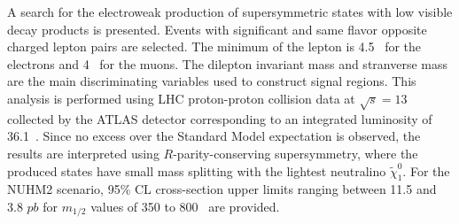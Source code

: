 A search for the electroweak production of supersymmetric states with low \pt visible decay products is presented.
Events with significant \met and same flavor opposite charged lepton pairs are selected.
The minimum \pt of the lepton is 4.5~{\GeV} for the electrons and 4~{\GeV} for the muons.
The dilepton invariant mass and stranverse mass are the main discriminating variables used to construct signal regions.
This analysis is performed using LHC proton-proton collision data at $\sqrt{s} = 13$~{\TeV} collected by the ATLAS detector corresponding to an integrated luminosity of 36.1~\ifb.
Since no excess over the Standard Model expectation is observed, the results are interpreted using $R$-parity-conserving supersymmetry, where the produced states have small mass splitting with the lightest neutralino $\widetilde{\chi}^{0}_{1}$.
For the NUHM2 scenario, 95\% CL cross-section upper limits ranging between 11.5 and 3.8 $pb$ for $m_{1/2}$ values of 350 to 800~{\GeV} are provided.
